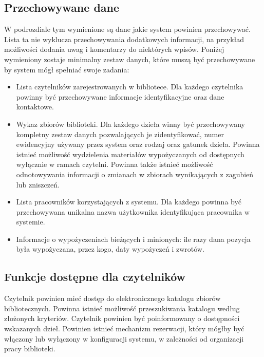 \documentclass[11pt,a4paper]{article}
\begin{document}
\subsection{Przechowywane dane}
W podrozdiale tym wymienione są dane jakie system powinien przechowywać. Lista
ta nie wyklucza przechowywania dodatkowych informacji, na przykład możliwości
dodania uwag i komentarzy do niektórych wpisów. Poniżej wymieniony zostaje
minimalny zestaw danych, które muszą być przechowywane by system mógł
spełniać swoje zadania:

\begin{itemize}
  \item Lista czytelników zarejestrowanych w bibliotece. Dla każdego czytelnika
    powinny być przechowywane informacje identyfikacyjne oraz dane kontaktowe.
  \item Wykaz zbiorów biblioteki. Dla każdego dzieła winny być przechowywany
    kompletny zestaw danych pozwalających je zidentyfikować, numer ewidencyjny
    używany przez system oraz rodzaj oraz gatunek dzieła. Powinna istnieć
    możliwość wydzielenia materiałów wypożyczanych od dostępnych wyłącznie w
    ramach czytelni. Powinna także istnieć możliwość odnotowywania informacji o
    zmianach w zbiorach wynikających z zagubień lub zniszczeń. 
  \item Lista pracowników korzystających z systemu. Dla każdego powinna
    być przechowywana unikalna nazwa użytkownika identyfikująca pracownika w
    systemie.
  \item Informacje o wypożyczeniach bieżących i minionych: ile razy dana
    pozycja była wypożyczana, przez kogo, daty wypożyczeń i zwrotów.
\end{itemize}

\subsection{Funkcje dostępne dla czytelników}
Czytelnik powinien mieć dostęp do elektronicznego katalogu zbiorów
bibliotecznych. Powinna istnieć możliwość przeszukiwania katalogu według
złożonych kryteriów. Czytelnik powinien być poinformowany o dostępności
wskazanych dzieł. Powinien istnieć mechanizm rezerwacji, który mógłby być
włączony lub wyłączony w konfiguracji systemu, w zależności od organizacji
pracy biblioteki.
\end{document}
